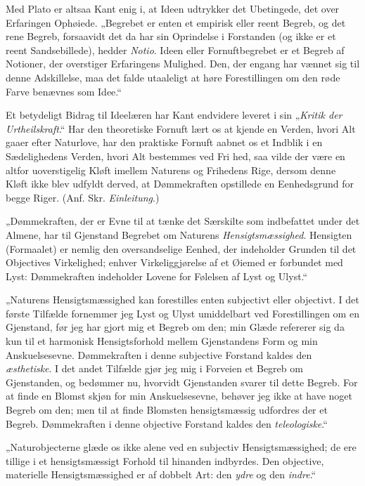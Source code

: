 \documentclass[12pt]{book}
\newcommand{\opage}[1]{\marginnote{\footnotesize\textit{[#1]}}}
\begin{document}
Med Plato er altsaa Kant enig i, at Ideen udtrykker det Ubetingede, det over Erfaringen
Ophøiede. „Begrebet er enten et empirisk eller reent Begreb, og det rene Begreb, forsaavidt det
da har sin Oprindelse i Forstanden (og ikke er et reent Sandsebillede), hedder \textit{Notio}.
Ideen eller Fornuftbegrebet er et Begreb af Notioner, der overstiger Erfaringens Mulighed. Den,
der engang har vænnet sig til denne Adskillelse, maa det falde utaaleligt at høre Forestillingen
om den røde Farve benævnes som Idee.“

Et betydeligt Bidrag til Ideelæren har Kant endvidere leveret i sin „\textit{Kritik der
Urtheilskraft}.“ Har den theoretiske Fornuft lært os at kjende en Verden, hvori Alt gaaer efter
Naturlove, har den praktiske Fornuft aabnet os et Indblik i en Sædelighedens Verden, hvori Alt
bestemmes ved Fri%
\opage{120}hed, saa vilde der være en altfor uoverstigelig Kløft imellem Naturens og Frihedens Rige,
dersom denne Kløft ikke blev udfyldt derved, at Dømmekraften opstillede en Eenhedsgrund for
begge Riger. (Anf. Skr. \textit{Einleitung}.)

„Dømmekraften, der er Evne til at tænke det Særskilte som indbefattet under det Almene, har til
Gjenstand Begrebet om Naturens \emph{Hensigtsmæssighed}. Hensigten (Formaalet) er nemlig den
oversandselige Eenhed, der indeholder Grunden til det Objectives Virkelighed; enhver
Virkeliggjørelse af et Øiemed er forbundet med Lyst: Dømmekraften indeholder Lovene for Følelsen
af Lyst og Ulyst.“

„Naturens Hensigtsmæssighed kan forestilles enten subjectivt eller objectivt. I det første
Tilfælde fornemmer jeg Lyst og Ulyst umiddelbart ved Forestillingen om en Gjenstand, før jeg
har gjort mig et Begreb om den; min Glæde refererer sig da kun til et harmonisk Hensigtsforhold
mellem Gjenstandens Form og min Anskuelsesevne. Dømmekraften i denne subjective Forstand kaldes
den \emph{æsthetiske}. I det andet Tilfælde gjør jeg mig i Forveien et Begreb om Gjenstanden, og
bedømmer nu, hvorvidt Gjenstanden svarer til dette Begreb. For at finde en Blomst skjøn for min
Anskuelsesevne, behøver jeg ikke at have noget Begreb om den; men til at finde Blomsten
hensigtsmæssig udfordres der et Begreb. Dømmekraften i denne objective Forstand kaldes den
\emph{teleologiske}.“

„Naturobjecterne glæde os ikke alene ved en subjectiv Hensigtsmæssighed; de ere tillige i et
hensigtsmæssigt Forhold til hinanden indbyrdes. Den objective, materielle Hensigtsmæssighed er
af dobbelt Art: den \emph{ydre} og den \emph{indre}.“
\end{document}
